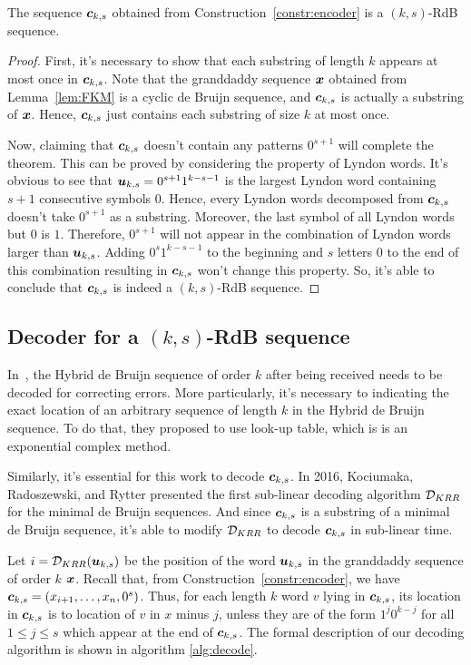 \begin{theorem}\label{theo:validity}
    The sequence ${\boldsymbol c}_{k,s}$ obtained from Construction~\ref{constr:encoder} is a $(k,s)$-RdB sequence.
\end{theorem}
\begin{proof}
    First, it's necessary to show that each substring of length $k$ appears at most once in ${\boldsymbol c}_{k,s}$. Note that the granddaddy sequence ${\boldsymbol x}$ obtained from Lemma~\ref{lem:FKM} is a cyclic de Bruijn sequence, and ${\boldsymbol c}_{k,s}$ is actually a substring of ${\boldsymbol x}$. Hence, ${\boldsymbol c}_{k,s}$ just contains each substring of size $k$ at most once.
    
    Now, claiming that ${\boldsymbol c}_{k,s}$ doesn't contain any patterns $0^{s+1}$ will complete the theorem. This can be proved by considering the property of Lyndon words. It's obvious to see that ${\boldsymbol u}_{k,s}=0^{s+1}1^{k-s-1}$ is the largest Lyndon word containing $s+1$ consecutive symbols $0$. Hence, every Lyndon words decomposed from ${\boldsymbol c}_{k,s}$ doesn't take $0^{s+1}$ as a substring. Moreover, the last symbol of all Lyndon words but $0$ is $1$. Therefore, $0^{s+1}$ will not appear in the combination of Lyndon words larger than ${\boldsymbol u}_{k,s}$. Adding $0^{s}1^{k-s-1}$ to the beginning and $s$ letters $0$ to the end of this combination resulting in ${\boldsymbol c}_{k,s}$ won't change this property. So, it's able to conclude that ${\boldsymbol c}_{k,s}$ is indeed a $(k,s)$-RdB sequence.
\end{proof}

\subsection{Decoder for a \texorpdfstring{$(k,s)$}{(k,s)}-RdB sequence}
In~\cite{zhang2021timing}, the Hybrid de Bruijn sequence of order $k$ after being received needs to be decoded for correcting errors. More particularly, it's necessary to indicating the exact location of an arbitrary sequence of length $k$ in the Hybrid de Bruijn sequence. To do that, they proposed to use look-up table, which is {\color{blue} is an exponential complex method}.

Similarly, it's essential for this work to decode ${\boldsymbol c}_{k,s}$. In 2016, Kociumaka, Radoszewski, and Rytter presented the first sub-linear decoding algorithm ${\cal D}_{KRR}$ for the minimal de Bruijn sequences. And since ${\boldsymbol c}_{k,s}$ is a substring of a minimal de Bruijn sequence, it's able to modify ${\cal D}_{KRR}$ to decode ${\boldsymbol c}_{k,s}$ in sub-linear time. 

Let $i={\cal D}_{KRR}({\boldsymbol u}_{k,s})$ be the position of the word ${\boldsymbol u}_{k,s}$ in the granddaddy sequence of order $k$ ${\boldsymbol x}$. Recall that, from Construction~\ref{constr:encoder}, we have ${\boldsymbol c}_{k,s}=(x_{i+1},\ldots,x_{n},0^{s})$. Thus, for each length $k$ word $v$ lying in ${\boldsymbol c}_{k,s}$, its location in ${\boldsymbol c}_{k,s}$ is to location of $v$ in $x$ minus $j$, unless they are of the form $1^{j}0^{k-j}$ for all $1\leq j\leq s$ which appear at the end of ${\boldsymbol c}_{k,s}$. The formal description of our decoding algorithm is shown in algorithm \ref{alg:decode}.


